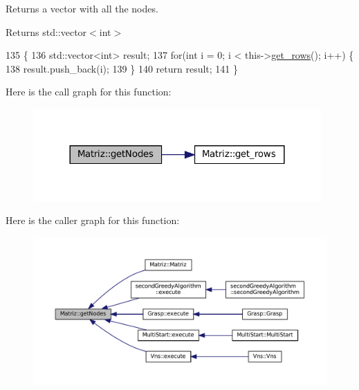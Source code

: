Returns a vector with all the nodes. 

\begin{DoxyReturn}{Returns}
std\+::vector$<$int$>$ 
\end{DoxyReturn}

\begin{DoxyCode}
135                                 \{
136   std::vector<int> result;
137   \textcolor{keywordflow}{for}(\textcolor{keywordtype}{int} i = 0; i < this->\hyperlink{classMatriz_a6b18342f8c083baece693ff41185a206}{get\_rows}(); i++) \{
138     result.push\_back(i);
139   \}
140   \textcolor{keywordflow}{return} result;
141 \}
\end{DoxyCode}
Here is the call graph for this function\+:
\nopagebreak
\begin{figure}[H]
\begin{center}
\leavevmode
\includegraphics[width=312pt]{classMatriz_a394b84a5ec13fd2f4d202ab218680afe_cgraph}
\end{center}
\end{figure}
Here is the caller graph for this function\+:
\nopagebreak
\begin{figure}[H]
\begin{center}
\leavevmode
\includegraphics[width=350pt]{classMatriz_a394b84a5ec13fd2f4d202ab218680afe_icgraph}
\end{center}
\end{figure}
\mbox{\label{classMatriz_ad2adc857ff1738ebfb7fe42de408737b}} 
